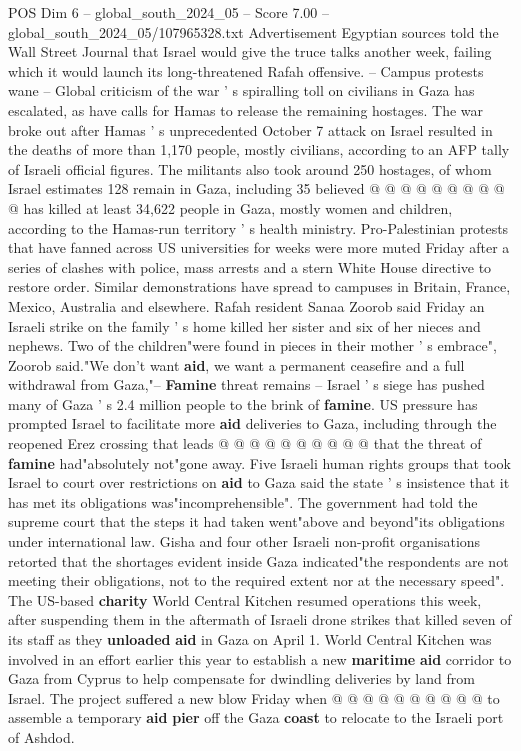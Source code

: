 \begin{textsample}{POS Dim 6 – global\_south\_2024\_05 – Score 7.00 – global\_south\_2024\_05/107965328.txt}
Advertisement Egyptian sources told the Wall Street Journal that Israel would give the truce talks another week, failing which it would launch its long-threatened Rafah offensive. -- Campus protests wane -- Global criticism of the war ' s spiralling toll on civilians in Gaza has escalated, as have calls for Hamas to release the remaining hostages.
The war broke out after Hamas ' s unprecedented October 7 attack on Israel resulted in the deaths of more than 1,170 people, mostly civilians, according to an AFP tally of Israeli official figures.
The militants also took around 250 hostages, of whom Israel estimates 128 remain in Gaza, including 35 believed @ @ @ @ @ @ @ @ @ @ has killed at least 34,622 people in Gaza, mostly women and children, according to the Hamas-run territory ' s health ministry.
Pro-Palestinian protests that have fanned across US universities for weeks were more muted Friday after a series of clashes with police, mass arrests and a stern White House directive to restore order.
Similar demonstrations have spread to campuses in Britain, France, Mexico, Australia and elsewhere.
Rafah resident Sanaa Zoorob said Friday an Israeli strike on the family ' s home killed her sister and six of her nieces and nephews.
Two of the children"were found in pieces in their mother ' s embrace", Zoorob said."We don't want \textbf{aid}, we want a permanent ceasefire and a full withdrawal from Gaza,"-- \textbf{Famine} threat remains -- Israel ' s siege has pushed many of Gaza ' s 2.4 million people to the brink of \textbf{famine}.
US pressure has prompted Israel to facilitate more \textbf{aid} deliveries to Gaza, including through the reopened Erez crossing that leads @ @ @ @ @ @ @ @ @ @ that the threat of \textbf{famine} had"absolutely not"gone away.
Five Israeli human rights groups that took Israel to court over restrictions on \textbf{aid} to Gaza said the state ' s insistence that it has met its obligations was"incomprehensible".
The government had told the supreme court that the steps it had taken went"above and beyond"its obligations under international law.
Gisha and four other Israeli non-profit organisations retorted that the shortages evident inside Gaza indicated"the respondents are not meeting their obligations, not to the required extent nor at the necessary speed".
The US-based \textbf{charity} World Central Kitchen resumed operations this week, after suspending them in the aftermath of Israeli drone strikes that killed seven of its staff as they \textbf{unloaded} \textbf{aid} in Gaza on April 1.
World Central Kitchen was involved in an effort earlier this year to establish a new \textbf{maritime} \textbf{aid} corridor to Gaza from Cyprus to help compensate for dwindling deliveries by land from Israel.
The project suffered a new blow Friday when @ @ @ @ @ @ @ @ @ @ to assemble a temporary \textbf{aid} \textbf{pier} off the Gaza \textbf{coast} to relocate to the Israeli port of Ashdod.

\end{textsample}
